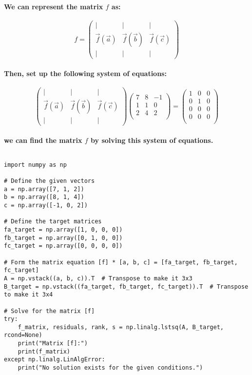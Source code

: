 \paragraph{We can represent the matrix $f$ as:}
% 
% 
% 
$$
    f = \begin{pmatrix} | & | & | \\ \vec{f}(\vec{a}) & \vec{f}(\vec{b}) & \vec{f}(\vec{c}) \\ | & | & | \end{pmatrix}
$$
% 
% 
% 
% 
\paragraph{Then, set up the following system of equations:}
% 
% 
% 
% 
$$
    \begin{pmatrix}
        |                & |                & |                \\
        \vec{f}(\vec{a}) & \vec{f}(\vec{b}) & \vec{f}(\vec{c}) \\
        |                & |                & |
    \end{pmatrix}
    \begin{pmatrix}
        7 & 8 & -1 \\
        1 & 1 & 0  \\
        2 & 4 & 2  \\
    \end{pmatrix}
    =
    \begin{pmatrix}
        1 & 0 & 0 \\
        0 & 1 & 0 \\
        0 & 0 & 0 \\
        0 & 0 & 0 \\
    \end{pmatrix}
$$
% 
% 
\paragraph{we can find the matrix $f$ by solving this system of equations.}
% 
$$$$
\begin{lstlisting}[style=pystyle]
import numpy as np

# Define the given vectors
a = np.array([7, 1, 2])
b = np.array([8, 1, 4])
c = np.array([-1, 0, 2])

# Define the target matrices
fa_target = np.array([1, 0, 0, 0])
fb_target = np.array([0, 1, 0, 0])
fc_target = np.array([0, 0, 0, 0])

# Form the matrix equation [f] * [a, b, c] = [fa_target, fb_target, fc_target]
A = np.vstack((a, b, c)).T  # Transpose to make it 3x3
B_target = np.vstack((fa_target, fb_target, fc_target)).T  # Transpose to make it 3x4

# Solve for the matrix [f]
try:
    f_matrix, residuals, rank, s = np.linalg.lstsq(A, B_target, rcond=None)
    print("Matrix [f]:")
    print(f_matrix)
except np.linalg.LinAlgError:
    print("No solution exists for the given conditions.")
\end{lstlisting}
% 
% 
% 
% 
% 
% 

